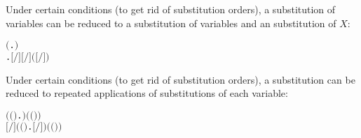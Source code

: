 \begin{lemma}
Under certain conditions (to get rid of substitution orders), a \multivariate substitution of variables
 can be reduced to a \multivariate substitution of
variables  and an \univariate substitution of $X$:
\begin{alltt}
\HOLTokenTurnstile{} \HOLSymConst{\HOLTokenNeg{}}   \HOLSymConst{\HOLTokenConj{}}   \HOLSymConst{\HOLTokenConj{}}   \HOLSymConst{\ensuremath{=}}   \HOLSymConst{\HOLTokenConj{}}
    \ensuremath{(}\HOLTokenLambda{}.  \HOLSymConst{\HOLTokenNotIn{}}  \ensuremath{)}  \HOLSymConst{\HOLTokenImp{}}
   \HOLSymConst{\HOLTokenForall{}}. \ensuremath{[}\HOLSymConst{::}\ensuremath{/}\HOLSymConst{::}\ensuremath{]}  \HOLSymConst{\ensuremath{=}} \ensuremath{[}\ensuremath{/}\ensuremath{]} \ensuremath{(}\ensuremath{[}\ensuremath{/}\ensuremath{]} \ensuremath{)}    
\end{alltt}
\end{lemma}

\begin{lemma}
Under certain conditions (to get rid of substitution orders), a
\multivariate substitution can be reduced to repeated applications
of \univariate substitutions of each variable:
\begin{alltt}
\HOLTokenTurnstile{}   \HOLSymConst{\HOLTokenConj{}}   \HOLSymConst{\ensuremath{=}}   \HOLSymConst{\HOLTokenConj{}}
    \ensuremath{(}\HOLTokenLambda{}\ensuremath{(}\HOLSymConst{,}\ensuremath{)}.   \HOLSymConst{\HOLTokenSubset{}} \HOLTokenLeftbrace{}\HOLTokenRightbrace{}\ensuremath{)} \ensuremath{(} \ensuremath{(}\HOLSymConst{,}\ensuremath{)}\ensuremath{)} \HOLSymConst{\HOLTokenImp{}}
   \ensuremath{[}\ensuremath{/}\ensuremath{]}  \HOLSymConst{\ensuremath{=}}  \ensuremath{(}\HOLTokenLambda{}\ensuremath{(}\HOLSymConst{,}\ensuremath{)} . \ensuremath{[}\ensuremath{/}\ensuremath{]} \ensuremath{)}  \ensuremath{(} \ensuremath{(}\HOLSymConst{,}\ensuremath{)}\ensuremath{)}    
\end{alltt}
\end{lemma}

